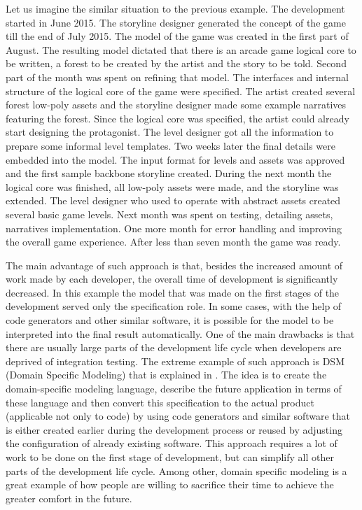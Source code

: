 \begin{example}\par
     Let us imagine the similar situation to the previous example.
      The development started in June 2015. The storyline designer generated the concept of the game till the end of July 2015. The model of the game was created in the first part of August. The resulting model dictated that there is an arcade game logical core to be written, a forest to be created by the artist and the story to be told. Second part of the month was spent on refining that model. The interfaces and internal structure of the logical core of the game were specified. The artist created several forest low-poly assets and the storyline designer made some example narratives featuring the forest. Since the logical core was specified, the artist could already start designing the protagonist. The level designer got all the information to prepare some informal level templates. Two weeks later the final details were embedded into the model. The input format for levels and assets was approved and the first sample backbone storyline created. During the next month the logical core was finished, all low-poly assets were made, and the storyline was extended. The level designer who used to operate with abstract assets created several basic game levels. Next month was spent on testing, detailing assets, narratives implementation. One more month for error handling and improving the overall game experience. After less than seven month the game was ready.
\end{example}
The main advantage of such approach is that, besides the increased amount of work made by each developer, the overall time of development is significantly decreased. In this example the model that was made on the first stages of the development served only the specification role. In some cases, with the help of code generators and other similar software, it is possible for the model to be interpreted into the final result automatically.
One of the main drawbacks is that there are usually large parts of the development life cycle when developers are deprived of integration testing.
The extreme example of such approach is DSM (Domain Specific Modeling) that is explained in \cite{DUMMY:7}. The idea is to create the domain-specific modeling language, describe the future application in terms of these language and then convert this specification to the actual product (applicable not only to code) by using code generators and similar software that is either created earlier during the development process or reused by adjusting the configuration of already existing software. This approach requires a lot of work to be done on the first stage of development, but can simplify all other parts of the development life cycle.
Among other, domain specific modeling is a great example of how people are willing to sacrifice their time to achieve the greater comfort in the future. 
